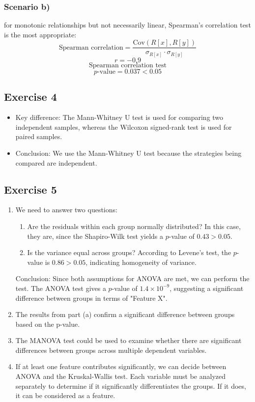 \documentclass{article}
\begin{document}
\subsubsection*{Scenario b)}
for monotonic relationships but not necessarily linear, Spearman's correlation test is the most appropriate:
\[
\text{Spearman correlation} = \frac{\text{Cov}(R[x], R[y])}{\sigma_{R[x]} \cdot \sigma_{R[y]}}
\]
\[
r = -0.9
\]
\[
\text{Spearman correlation test}
\]
\[
p\text{-value} = 0.037 < 0.05
\]

\subsection*{Exercise 4}
\begin{itemize}
    \item Key difference: The Mann-Whitney U test is used for comparing two independent samples, whereas the Wilcoxon signed-rank test is used for paired samples.
    \item Conclusion: We use the Mann-Whitney U test because the strategies being compared are independent.
\end{itemize}

\subsection*{Exercise 5}
\begin{enumerate}[label= \alph*]
    \item We need to answer two questions:
    \begin{enumerate}
        \item Are the residuals within each group normally distributed? In this case, they are, since the Shapiro-Wilk test yields a \( p \)-value of \( 0.43 > 0.05 \).
        \item Is the variance equal across groups? According to Levene's test, the \( p \)-value is \( 0.86 > 0.05 \), indicating homogeneity of variance.
    \end{enumerate}
    Conclusion: Since both assumptions for ANOVA are met, we can perform the test. The ANOVA test gives a \( p \)-value of \( 1.4 \times 10^{-9} \), suggesting a significant difference between groups in terms of "Feature X".
    
    \item The results from part (a) confirm a significant difference between groups based on the p-value.
    
    \item The MANOVA test could be used to examine whether there are significant differences between groups across multiple dependent variables.
    
    \item If at least one feature contributes significantly, we can decide between ANOVA and the Kruskal-Wallis test. Each variable must be analyzed separately to determine if it significantly differentiates the groups. If it does, it can be considered as a feature.
\end{enumerate}
\end{document}
